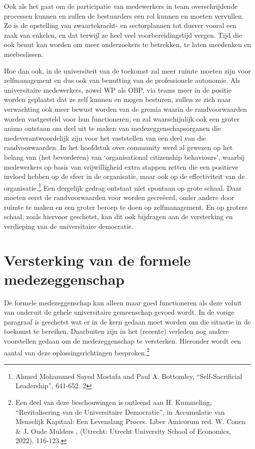 \documentclass{jote-book}
\begin{document}
	Ook als het gaat om de participatie van medewerkers in team overschrijdende processen kunnen en zullen de bestuurders een rol kunnen en moeten vervullen. Zo is de opstelling van zwaartekracht- en sectorplannen tot dusver vooral een zaak van enkelen, en dat terwijl ze heel veel voorbereidingstijd vergen. Tijd die ook benut kan worden om meer onderzoekers te betrekken, te laten meedenken en meebeslissen.



	Hoe dan ook, in de universiteit van de toekomst zal meer ruimte moeten zijn voor zelfmanagement en dus ook van benutting van de professionele autonomie. Als universitaire medewerkers, zowel WP als OBP, via teams meer in de positie worden geplaatst dat ze zelf kunnen en mogen besturen, zullen ze zich naar verwachting ook meer bewust worden van de gremia waarin de randvoorwaarden worden vastgesteld voor hun functioneren, en zal waarschijnlijk ook een groter animo ontstaan om deel uit te maken van medezeggenschapsorganen die medeverantwoordelijk zijn voor het vaststellen van een deel van die randvoorwaarden. In het hoofdstuk over community werd al gewezen op het belang van (het bevorderen) van ‘organisational citizenship behaviours', waarbij medewerkers op basis van vrijwilligheid extra stappen zetten die een positieve invloed hebben op de sfeer in de organisatie, maar ook op de effectiviteit van de organisatie.\footnote{Ahmed Mohammed Sayed Mostafa and Paul A. Bottomley, “Self-Sacrificial Leadership”, 641-652. 2} Een dergelijk gedrag ontstaat niet spontaan op grote schaal. Daar moeten eerst de randvoorwaarden voor worden gecreëerd, onder andere door ruimte te maken en een groter beroep te doen op zelfmanagement. En op grotere schaal, zoals hiervoor geschetst, kan dit ook bijdragen aan de versterking en verdieping van de universitaire democratie.



	\section{Versterking van de formele medezeggenschap}



	De formele medezeggenschap kan alleen maar goed functioneren als deze voluit van onderuit de gehele universitaire gemeenschap gevoed wordt. In de vorige paragraaf is geschetst wat er in de kern gedaan moet worden om die situatie in de toekomst te bereiken. Daarbuiten zijn in het (recente) verleden nog andere voorstellen gedaan om de medezeggenschap te versterken. Hieronder wordt een aantal van deze oplossingsrichtingen besproken.\footnote{Een deel van deze beschouwingen is ontleend aan H. Kummeling, “Revitalisering van de Universitaire Democratie”, in Accumulatie van Menselijk Kapitaal: Een Levenslang Proces. Liber Amicorum red. W. Conen \& J. Oude Mulders , (Utrecht: Utrecht University School of Economics, 2022), 116-123.}
\end{document}
